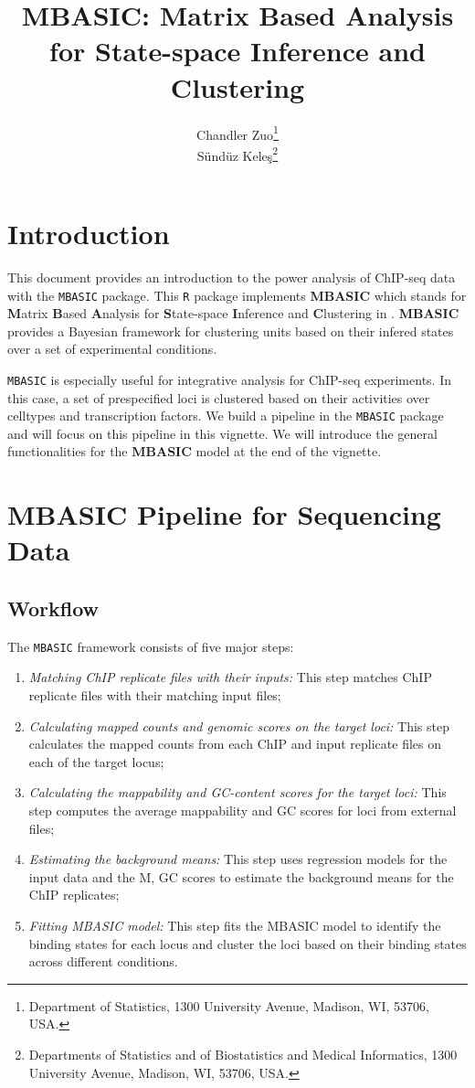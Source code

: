 \documentclass[a4paper,10pt]{article}
\title{MBASIC: Matrix Based Analysis for State-space Inference and Clustering}
\author{Chandler Zuo\footnote{Department of Statistics, 1300 University Avenue, Madison, WI, 53706, USA.}  \\
S\"und\"uz Kele\c{s}\footnote{Departments of Statistics and of  Biostatistics and Medical Informatics, 1300 University Avenue, Madison, WI, 53706, USA.}}
\date{}
\begin{document}
\maketitle

\tableofcontents

\section{Introduction}

This document provides an introduction to the power analysis of ChIP-seq data with
the \texttt{MBASIC} package. This \texttt{R} package implements \textbf{MBASIC} which stands for \textbf{M}atrix \textbf{B}ased \textbf{A}nalysis for \textbf{S}tate-space \textbf{I}nference and \textbf{C}lustering in \cite{zuo14}. \textbf{MBASIC} provides a Bayesian framework for clustering units based on their infered states over a set of experimental conditions.

\texttt{MBASIC} is especially useful for integrative analysis for ChIP-seq experiments. In this case, a set of prespecified loci is clustered based on their activities over celltypes and transcription factors. We build a pipeline in the \texttt{MBASIC} package and will focus on this pipeline in this vignette. We will introduce the general functionalities for the \textbf{MBASIC} model at the end of the vignette.

\section{MBASIC Pipeline for Sequencing Data}

\subsection{Workflow}

The \texttt{MBASIC} framework consists of five major steps:

\begin{enumerate}
  \item \textit{Matching ChIP replicate files with their inputs:} This step matches ChIP replicate files with their matching input files;
  \item \textit{Calculating mapped counts and genomic scores on the target loci:} This step calculates the mapped counts from each ChIP and input replicate files on each of the target locus;
  \item \textit{Calculating the mappability and GC-content scores for the target loci:} This step computes the average mappability and GC scores for loci from external files;
  \item \textit{Estimating the background means:} This step uses regression models for the input data and the M, GC scores to estimate the background means for the ChIP replicates;
  \item \textit{Fitting MBASIC model:} This step fits the MBASIC model to identify the binding states for each locus and cluster the loci based on their binding states across different conditions.
\end{enumerate}
\end{document}
